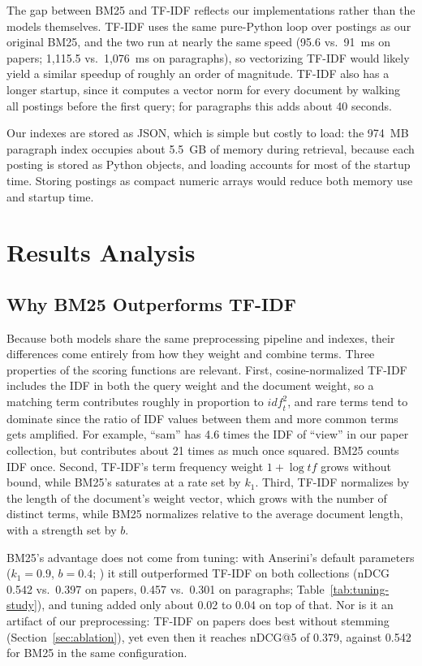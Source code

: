 \documentclass[sigconf,nonacm]{acmart}
\begin{document}
The gap between BM25 and TF-IDF reflects our implementations rather than
the models themselves. TF-IDF uses the same pure-Python loop over
postings as our original BM25, and the two run at nearly the same speed
(95.6 vs.\ 91~ms on papers; 1,115.5 vs.\ 1,076~ms on paragraphs), so
vectorizing TF-IDF would likely yield a similar speedup of roughly an
order of magnitude. TF-IDF also has a longer startup, since it computes a
vector norm for every document by walking all postings before the first
query; for paragraphs this adds about 40 seconds.

Our indexes are stored as JSON, which is simple but costly to load: the
974~MB paragraph index occupies about 5.5~GB of memory during retrieval,
because each posting is stored as Python objects, and loading accounts
for most of the startup time. Storing postings as compact numeric arrays
would reduce both memory use and startup time.

\section{Results Analysis}
\label{sec:analysis}

\subsection{Why BM25 Outperforms TF-IDF}
\label{sec:why-bm25}

Because both models share the same preprocessing pipeline and indexes, their
differences come entirely from how they weight and combine terms. Three properties
of the scoring functions are relevant. First, cosine-normalized TF-IDF includes
the IDF in both the query weight and the document weight, so a matching term 
contributes roughly in proportion to $\mathit{idf}_t^2$, and rare terms tend to dominate 
since the ratio of IDF values between them and more common terms gets amplified. 
For example, ``sam'' has 4.6 times the IDF of ``view'' in our paper collection, but contributes 
about 21 times as much once squared. BM25 counts IDF once. Second, TF-IDF's term frequency 
weight $1 + \log \mathit{tf}$ grows without bound, while BM25's saturates at a rate set by 
$k_1$. Third, TF-IDF normalizes by the length of the document's weight vector, which grows 
with the number of distinct terms, while BM25 normalizes relative to the average document
length, with a strength set by $b$.

BM25's advantage does not come from tuning: with Anserini's default parameters 
($k_1 = 0.9$, $b = 0.4$; \cite{yang2017anserini}) it still outperformed TF-IDF
on both collections (nDCG 0.542 vs.\ 0.397 on papers, 0.457 vs.\ 0.301 on paragraphs;
Table~\ref{tab:tuning-study}), and tuning added only about 0.02 to 0.04 on top of that.
Nor is it an artifact of our preprocessing: TF-IDF on papers does best without stemming
(Section~\ref{sec:ablation}), yet even then it reaches nDCG@5 of 0.379, against 0.542 for
BM25 in the same configuration. 
\end{document}
